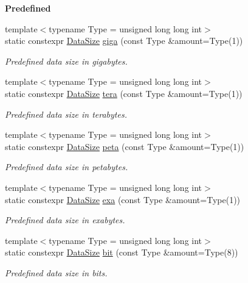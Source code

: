 \begin{Indent}{\bf Predefined}
\begin{DoxyCompactItemize}
{\footnotesize template$<$typename Type  = unsigned long long int$>$ }\\static constexpr \hyperlink{exceptionmagrathea_1_1DataSize}{Data\-Size} \hyperlink{exceptionmagrathea_1_1DataSize_aada5bca96ee00f7c52cd5777d42e64fe}{giga} (const Type \&amount=Type(1))
\begin{DoxyCompactList}\small\item\em Predefined data size in gigabytes. \end{DoxyCompactList}\item 
{\footnotesize template$<$typename Type  = unsigned long long int$>$ }\\static constexpr \hyperlink{exceptionmagrathea_1_1DataSize}{Data\-Size} \hyperlink{exceptionmagrathea_1_1DataSize_adab1c667b7286de648e238221037da8e}{tera} (const Type \&amount=Type(1))
\begin{DoxyCompactList}\small\item\em Predefined data size in terabytes. \end{DoxyCompactList}\item 
{\footnotesize template$<$typename Type  = unsigned long long int$>$ }\\static constexpr \hyperlink{exceptionmagrathea_1_1DataSize}{Data\-Size} \hyperlink{exceptionmagrathea_1_1DataSize_a956908e22027ada049656164e9035481}{peta} (const Type \&amount=Type(1))
\begin{DoxyCompactList}\small\item\em Predefined data size in petabytes. \end{DoxyCompactList}\item 
{\footnotesize template$<$typename Type  = unsigned long long int$>$ }\\static constexpr \hyperlink{exceptionmagrathea_1_1DataSize}{Data\-Size} \hyperlink{exceptionmagrathea_1_1DataSize_a619786a80f92e735d750d329057173d5}{exa} (const Type \&amount=Type(1))
\begin{DoxyCompactList}\small\item\em Predefined data size in exabytes. \end{DoxyCompactList}\item 
{\footnotesize template$<$typename Type  = unsigned long long int$>$ }\\static constexpr \hyperlink{exceptionmagrathea_1_1DataSize}{Data\-Size} \hyperlink{exceptionmagrathea_1_1DataSize_ac37ca732763000b06b7ce2c3f68c419c}{bit} (const Type \&amount=Type(8))
\begin{DoxyCompactList}\small\item\em Predefined data size in bits. \end{DoxyCompactList}\end{DoxyCompactItemize}
\end{Indent}
